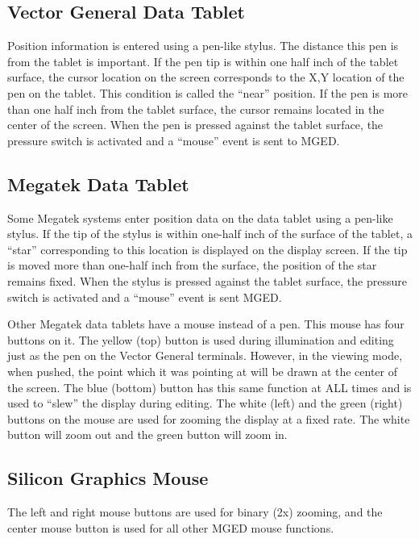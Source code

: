 \subsection{Vector General Data Tablet}

Position information is entered using a pen-like stylus.
The distance this pen is from the tablet is important.
If the pen tip is within one half inch of the tablet surface, the cursor
location on the screen corresponds to the X,Y location of the
pen on the tablet.  This condition is called the ``near'' position.
If the pen is more than one half inch from the tablet surface, the
cursor remains located in the center of the screen.
When the pen is pressed against the tablet surface,
the pressure switch is activated and a ``mouse'' event
is sent to MGED.

\subsection{Megatek Data Tablet}

Some Megatek systems enter position data on the data tablet
using a pen-like stylus.
If the tip of the stylus is
within one-half inch of the surface of the tablet, a ``star'' corresponding
to this location is displayed on the display screen.  If the tip is moved
more than one-half inch from the surface, the position of the star remains
fixed.  When the stylus is pressed against the tablet surface, the pressure
switch is activated and a ``mouse'' event is sent MGED.

Other Megatek data tablets have a mouse instead of a pen.
This mouse has four buttons on it.
The yellow (top) button is used during illumination and editing just as the
pen on the Vector General terminals.
However, in the viewing mode, when pushed, the point which it was pointing
at will be drawn at the center of the screen.
The blue (bottom) button has this same function at ALL times and is used
to ``slew'' the display during editing.
The white (left) and the green (right) buttons on the mouse are used for
zooming the display at a fixed rate.
The white button will zoom out and the green button will zoom in.

\subsection{Silicon Graphics Mouse}

The left and right mouse buttons are used for binary (2x) zooming,
and the center mouse button is used for all other MGED mouse functions.

